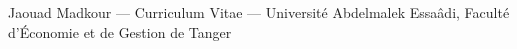 \documentclass[10.5pt,a4paper]{article}
\begin{document}
\vspace{28pt}
\begin{center}
{\sffamily\fontsize{7.7}{10}\selectfont\color{textsoft} Jaouad Madkour --- Curriculum Vitae --- Université Abdelmalek Essaâdi, Faculté d'Économie et de Gestion de Tanger}
\end{center}
\end{document}
